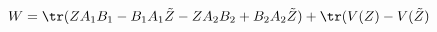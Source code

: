 \begin{equation}\label{eq:super1}
W = \tr( Z A_1B_1 - B_1 A_1 \tilde Z - ZA_2B_2+B_2A_2 \tilde Z)
+\tr(V(Z) - V(\tilde Z)
\end{equation}

